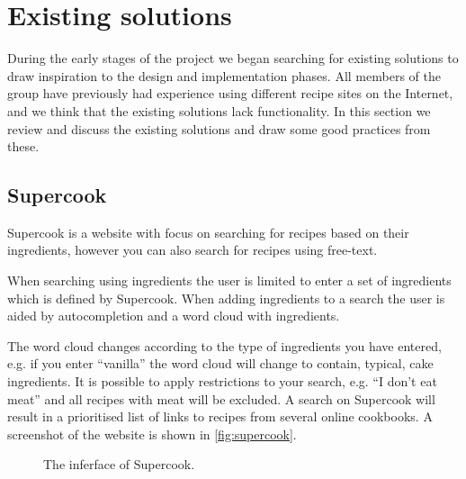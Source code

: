 \section{Existing solutions}\label{sec:exist}

During the early stages of the project we began searching for existing solutions to draw inspiration to the design and implementation phases. All members of the group have previously had experience using different recipe sites on the Internet, and we think that the existing solutions lack functionality. In this section we review and discuss the existing solutions and draw some good practices from these.

\subsection{Supercook}
Supercook\cite{supercook} is a website with focus on searching for recipes based on their ingredients, however you can also search for recipes using free-text. 

When searching using ingredients the user is limited to enter a set of ingredients which is defined by Supercook. When adding ingredients to a search the user is aided by autocompletion and a word cloud with ingredients.

The word cloud changes according to the type of ingredients you have entered, e.g. if you enter ``vanilla'' the word cloud will change to contain, typical, cake ingredients. It is possible to apply restrictions to your search, e.g. ``I don't eat meat'' and all recipes with meat will be excluded. A search on Supercook will result in a prioritised list of links to recipes from several online cookbooks. A screenshot of the website is shown in \autoref{fig:supercook}.

\begin{figure}[H]
\centering
{}
\caption{The inferface of Supercook.}
\label{fig:supercook}
\end{figure}

